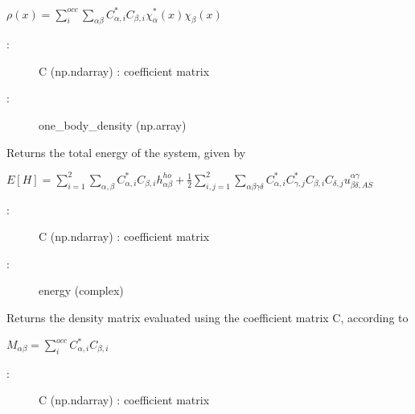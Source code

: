 \documentclass[letterpaper,10pt,english]{sphinxmanual}
\begin{document}
\begin{fulllineitems}
\begin{fulllineitems}
\(\rho(x) = \sum_i^{occ} \sum_{\alpha\beta} C_{\alpha,i}^* C_{\beta,i} \chi_{\alpha}^*(x) \chi_{\beta}(x)\)
\begin{description}
\item[{:}] \leavevmode
C (np.ndarray) : coefficient matrix

\item[{:}] \leavevmode
one\_body\_density (np.array)

\end{description}

\end{fulllineitems}


\begin{fulllineitems}
\label{\detokenize{index:do.GHF.eval_total_energy}}
Returns the total energy of the system, given by

\(E[H] = \sum_{i=1}^2 \sum_{\alpha,\beta} C_{\alpha,i}^* C_{\beta,i} h_{\alpha\beta}^{ho} + \frac{1}{2} \sum_{i,j=1}^2 \sum_{\alpha\beta\gamma\delta} C_{\alpha,i}^* C_{\gamma,j}^* C_{\beta,i} C_{\delta,j}  u^{\alpha\gamma}_{\beta\delta,AS}\)
\begin{description}
\item[{:}] \leavevmode
C (np.ndarray) : coefficient matrix

\item[{:}] \leavevmode
energy (complex)

\end{description}

\end{fulllineitems}


\begin{fulllineitems}
\label{\detokenize{index:do.GHF.fill_density_matrix}}
Returns the density matrix evaluated using the coefficient matrix C, according to

\(M_{\alpha\beta} = \sum_i^{occ} C_{\alpha,i}^* C_{\beta,i}\)
\begin{description}
\item[{:}] \leavevmode
C (np.ndarray) : coefficient matrix


\end{description}
\end{fulllineitems}
\end{fulllineitems}
\end{document}
